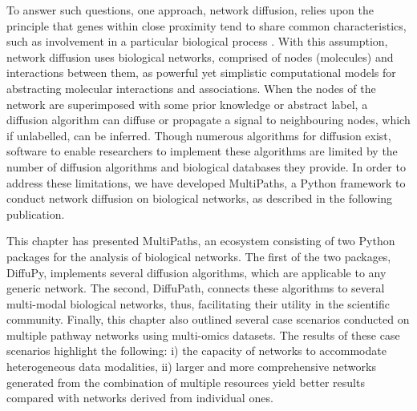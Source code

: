  To answer such questions, one approach, network diffusion, relies upon the principle that genes within close proximity tend to share common characteristics, such as involvement in a particular biological process \parencite{cowen2017}. With this assumption, network diffusion uses biological networks, comprised of nodes (molecules) and interactions between them, as powerful yet simplistic computational models for abstracting molecular interactions and associations. When the nodes of the network are superimposed with some prior knowledge or abstract label, a diffusion algorithm can diffuse or propagate a signal to neighbouring nodes, which if unlabelled, can be inferred. Though numerous algorithms for diffusion exist, software to enable researchers to implement these algorithms are limited by the number of diffusion algorithms and biological databases they provide. In order to address these limitations, we have developed MultiPaths, a Python framework to conduct network diffusion on biological networks, as described in the following publication.  

This chapter has presented MultiPaths, an ecosystem consisting of two Python packages for the analysis of biological networks. The first of the two packages, DiffuPy, implements several diffusion algorithms, which are applicable to any generic network. The second, DiffuPath, connects these algorithms to several multi-modal biological networks, thus, facilitating their utility in the scientific community. Finally, this chapter also outlined several case scenarios conducted on multiple pathway networks using multi-omics datasets. The results of these case scenarios highlight the following: i) the capacity of networks to accommodate heterogeneous data modalities, ii) larger and more comprehensive networks generated from the combination of multiple resources yield better results compared with networks derived from individual ones.
